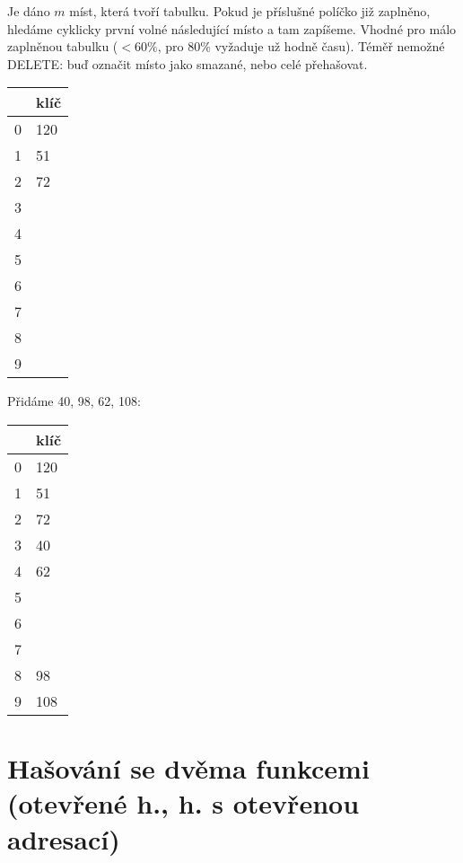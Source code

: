 Je dáno $m$ míst, která tvoří tabulku. Pokud je příslušné políčko již
zaplněno, hledáme cyklicky první volné následující místo a tam
zapíšeme. Vhodné pro málo zaplněnou tabulku ($<60\%$, pro $80\%$ 
vyžaduje už hodně času). Téměř nemožné DELETE: buď označit místo jako smazané, nebo
celé přehašovat. 


\vspace{5mm}

\begin{tabular}{|l|l|}
\hline
& klíč\\
\hline
0& 120\\
1& 51\\
2& 72\\
3& \\
4& \\
5& \\
6& \\
7& \\
8& \\
9& \\
\hline
\end{tabular}

\vspace{8mm}

Přidáme 40, 98, 62, 108:

\vspace{5mm}

\begin{tabular}{|l|l|}
\hline
& klíč\\
\hline
0& 120\\
1& 51\\
2& 72\\
3& 40\\
4& 62\\
5& \\
6& \\
7& \\
8& 98\\
9& 108\\
\hline
\end{tabular}


\section{Hašování se dvěma funkcemi (otevřené h., h. s otevřenou adresací)}

